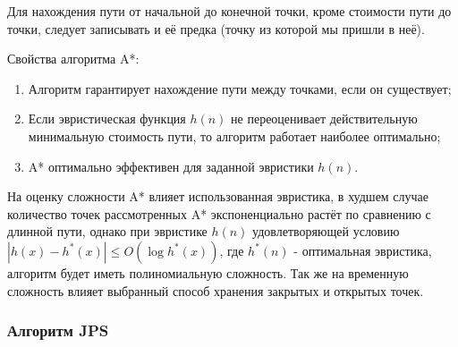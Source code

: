 Для нахождения пути от начальной до конечной точки, кроме стоимости пути до точки, следует записывать и её предка (точку из которой мы пришли в неё).


Свойства алгоритма A*:

\begin{enumerate}
    \item Алгоритм гарантирует нахождение пути между точками, если он существует;
    \item Если эвристическая функция $h(n)$ не переоценивает действительную минимальную стоимость пути, то алгоритм работает наиболее оптимально;
    \item A* оптимально эффективен для заданной эвристики $h(n)$.
\end{enumerate}

На оценку сложности A* влияет использованная эвристика, в худшем случае количество точек рассмотренных A* экспоненциально растёт по сравнению с длинной пути, однако при эвристике $h(n)$ удовлетворяющей условию $|h(x) - h^*(x)| \leq O(\log h^*(x))$, где $h^*(n)$ - оптимальная эвристика, алгоритм будет иметь полиномиальную сложность. Так же на временную сложность влияет выбранный способ хранения закрытых и открытых точек.

\subsubsection{Алгоритм JPS}

